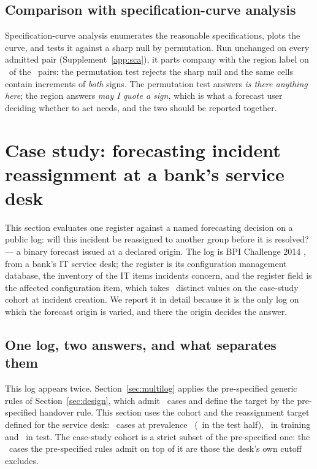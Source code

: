 \documentclass[11pt,3p,review,authoryear]{elsarticle}
\theoremstyle{definition}
\begin{document}
\subsection{Comparison with specification-curve analysis}
\label{sec:sca}

Specification-curve analysis \citep{simonsohn2020specification} enumerates
the reasonable specifications, plots the curve, and tests it against a sharp
null by permutation. Run unchanged on every admitted pair
(Supplement~\ref{app:sca}), it parts company with the region label on
\nScaDisagree\ of the \nScaPairs\ pairs: the permutation test rejects the
sharp null and the same cells contain increments of \emph{both} signs. The
permutation test answers \emph{is there anything here}; the region answers
\emph{may I quote a sign}, which is what a forecast user deciding whether to
act needs, and the two should be reported together.
\section{Case study: forecasting incident reassignment at a bank's service desk}
\label{sec:cmdb}

This section evaluates one register against a named forecasting decision on
a public log: will this incident be reassigned to another group before it is
resolved? --- a binary forecast issued at a declared origin. The log is BPI
Challenge 2014 \citep{vandongen2014bpic}, from a bank's IT service desk; the
register is its configuration management database, the inventory of the IT
items incidents concern, and the register field is the affected
configuration item, which takes \cardTauTwo\ distinct values on the
case-study cohort at incident creation. We report it in detail because it is
the only log on which the forecast origin is varied, and there the origin
decides the answer.

\subsection{One log, two answers, and what separates them}
\label{sec:cohort}

This log appears twice. Section~\ref{sec:multilog} applies the pre-specified
generic rules of Section~\ref{sec:design}, which admit \nRegisteredCohort\
cases and define the target by the pre-specified handover rule. This section
uses the cohort and the reassignment target defined for the service desk:
\nCohort\ cases at prevalence \casePrevalence\ (\casePrevalenceTest\ in the
test half), \nCaseTrain\ in training and \nCaseTest\ in test. The case-study
cohort is a strict subset of the pre-specified one: the \nExtraCases\ cases
the pre-specified rules admit on top of it are those the desk's own cutoff
excludes.
\end{document}
